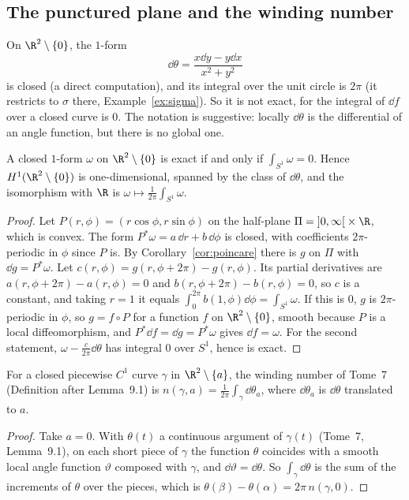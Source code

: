 \subsection*{The punctured plane and the winding number}

On $\R^2\setminus\{0\}$, the $1$-form
\[
\dd\theta=\frac{x\dd y-y\dd x}{x^2+y^2}
\]
is closed (a direct computation), and its integral over the unit circle is $2\pi$ (it restricts to $\sigma$ there, Example~\ref{ex:sigma}). So it is not exact,
for the integral of $\dd f$ over a closed curve is $0$. The notation is suggestive: locally $\dd\theta$ is the differential of an angle function, but there is no
global one.

\begin{theorem}\label{thm:h1punctured}
A closed $1$-form $\omega$ on $\R^2\setminus\{0\}$ is exact if and only if $\int_{S^1}\omega=0$. Hence $H^1(\R^2\setminus\{0\})$ is one-dimensional, spanned by the class of
$\dd\theta$, and the isomorphism with $\R$ is $\omega\mapsto\frac1{2\pi}\int_{S^1}\omega$.
\end{theorem}
\begin{proof}
Let $P(r,\phi)=(r\cos\phi,r\sin\phi)$ on the half-plane $\Pi=\left]0,\infty\right[\times\R$, which is convex. The form $P^*\omega=a\,\dd r+b\,\dd\phi$ is closed, with coefficients
$2\pi$-periodic in $\phi$ since $P$ is. By Corollary~\ref{cor:poincare} there is $g$ on $\Pi$ with $\dd g=P^*\omega$. Let $c(r,\phi)=g(r,\phi+2\pi)-g(r,\phi)$. Its partial derivatives
are $a(r,\phi+2\pi)-a(r,\phi)=0$ and $b(r,\phi+2\pi)-b(r,\phi)=0$, so $c$ is a constant, and taking $r=1$ it equals $\int_0^{2\pi}b(1,\phi)\dd\phi=\int_{S^1}\omega$. If this is $0$, $g$ is
$2\pi$-periodic in $\phi$, so $g=f\circ P$ for a function $f$ on $\R^2\setminus\{0\}$, smooth because $P$ is a local diffeomorphism, and $P^*\dd f=\dd g=P^*\omega$ gives $\dd f=\omega$. For
the second statement, $\omega-\frac c{2\pi}\dd\theta$ has integral $0$ over $S^1$, hence is exact.
\end{proof}

\begin{corollary}\label{cor:windingintegral}
For a closed piecewise $C^1$ curve $\gamma$ in $\R^2\setminus\{a\}$, the winding number of Tome~7 (Definition after Lemma~9.1) is
$n(\gamma,a)=\frac1{2\pi}\int_\gamma\dd\theta_a$, where $\dd\theta_a$ is $\dd\theta$ translated to $a$.
\end{corollary}
\begin{proof}
Take $a=0$. With $\theta(t)$ a continuous argument of $\gamma(t)$ (Tome~7, Lemma~9.1), on each short piece of $\gamma$ the function $\theta$ coincides with a smooth local angle
function $\vartheta$ composed with $\gamma$, and $\dd\vartheta=\dd\theta$. So $\int_\gamma\dd\theta$ is the sum of the increments of $\theta$ over the pieces, which is $\theta(\beta)-\theta(\alpha)=2\pi\,n(\gamma,0)$.
\end{proof}

